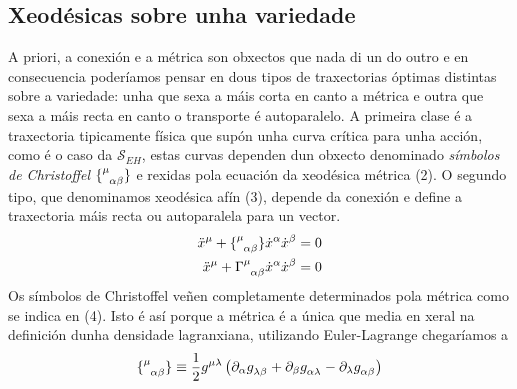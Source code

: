 \subsection{Xeodésicas sobre unha variedade}
A priori, a conexión e a métrica son obxectos que nada di un do outro e en consecuencia poderíamos pensar en dous tipos de traxectorias óptimas distintas sobre a variedade: unha que sexa a máis corta en canto a métrica e outra que sexa a máis recta en canto o transporte é autoparalelo. A primeira clase é a traxectoria tipicamente física que supón unha curva crítica para unha acción, como é o caso da $\mathcal{S}_{EH}$, estas curvas dependen dun obxecto denominado \textit{símbolos de Christoffel} $\{ \indices{^\mu_\alpha_\beta}\}$ e rexidas pola ecuación da xeodésica métrica (2). O segundo tipo, que denominamos xeodésica afín (3), depende da conexión e define a traxectoria máis recta ou autoparalela para un vector. 
\begin{align}
    \ddot{x}\indices{^\mu} + \{ \indices{^\mu_\alpha_\beta}\}\dot{x}\indices{^\alpha}\dot{x}\indices{^\beta} = 0\\
    \ddot{x}\indices{^\mu} + \Gamma\indices{^\mu_\alpha_\beta}\dot{x}\indices{^\alpha}\dot{x}\indices{^\beta} = 0
\end{align}
Os símbolos de Christoffel veñen completamente determinados pola métrica como se indica en (4). Isto é así porque a métrica é a única que media en xeral na definición dunha densidade lagranxiana, utilizando Euler-Lagrange chegaríamos a
\begin{align}
    \{ \indices{^\mu_\alpha_\beta}\} \equiv \levicivita
\end{align}

